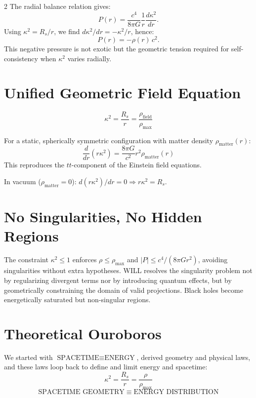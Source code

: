 \documentclass[10pt, a4paper]{article}
\begin{document}
\begin{multicols}{2}
The radial balance relation gives:
\[
P(r) = \frac{c^4}{8\pi G}\frac{1}{r}\frac{d\kappa^2}{dr}.
\]
Using $\kappa^2 = R_s/r$, we find $d\kappa^2/dr = -\kappa^2/r$, hence:
\[
\boxed{P(r) = -\rho(r)\,c^2.}
\]
This negative pressure is not exotic but the geometric tension required for self-consistency when $\kappa^2$ varies radially.


\section{Unified Geometric Field Equation}
\hypertarget{eq:unified_field}{}\label{eq:unified_field}

\[
\boxed{\kappa^2 = \frac{R_s}{r} = \frac{\rho_{\text{field}}}{\rho_{\max}}}
\]

For a static, spherically symmetric configuration with matter density $\rho_{\text{matter}}(r)$:
\hypertarget{eq:will_field_diff}{}\label{eq:will_field_diff}
\begin{equation}
\boxed{\frac{d}{dr}(r\kappa^{2}) = \frac{8\pi G}{c^{2}} r^{2}\rho_{\text{matter}}(r)}
\end{equation}
This reproduces the $tt$-component of the Einstein field equations.

In vacuum ($\rho_{\text{matter}} = 0$): $d(r\kappa^2)/dr = 0 \Longrightarrow r\kappa^2 = R_s$.


\section{No Singularities, No Hidden Regions}
\hypertarget{sec:no_singularities}{}\label{sec:no_singularities}

The constraint $\kappa^2\le 1$ enforces $\rho\le\rho_{\max}$ and $|P|\le c^4/(8\pi G r^2)$, avoiding singularities without extra hypotheses. WILL resolves the singularity problem not by regularizing divergent terms nor by introducing quantum effects, but by geometrically constraining the domain of valid projections. Black holes become energetically saturated but non-singular regions.


\section{Theoretical Ouroboros}
\hypertarget{sec:ouroboros}{}\label{sec:ouroboros}

\hypertarget{eq:unified_identity}{}\label{eq:unified_identity}
We started with $\text{SPACETIME} \equiv \text{ENERGY}$, derived geometry and physical laws, and these laws loop back to define and limit energy and spacetime:
\[
\boxed{\kappa^2 = \frac{R_s}{r} = \frac{\rho}{\rho_{\max}}}
\]
\[
\boxed{
\text{SPACETIME GEOMETRY} \;\equiv\; \text{ENERGY DISTRIBUTION}
}
\]



\end{multicols}
\end{document}
